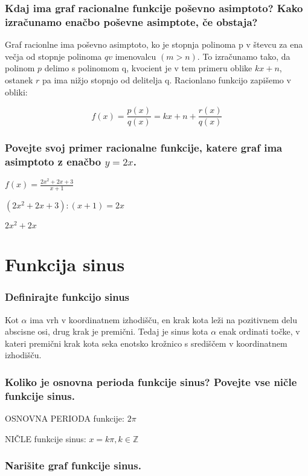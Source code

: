 \documentclass{article}
\begin{document}
\subsubsection*{Kdaj ima graf racionalne funkcije poševno asimptoto? Kako izračunamo enačbo poševne asimptote, če obstaja?}

Graf racionlne ima poševno asimptoto, ko je stopnja polinoma p v števcu za ena večja od stopnje polinoma $q v$ imenovalcu $(m>n)$. To izračunamo tako, da polinom $p$ delimo s polinomom q, kvocient je v tem primeru oblike $k x+n$, ostanek $r$ pa ima nižjo stopnjo od delitelja q. Racionlano funkcijo zapišemo v obliki:

$$
f(x)=\frac{p(x)}{q(x)}=k x+n+\frac{r(x)}{q(x)}
$$

\subsubsection*{Povejte svoj primer racionalne funkcije, katere graf ima asimptoto z enačbo $y=2 x$.}

$f(x)=\frac{2 x^{2}+2 x+3}{x+1}$

$\left(2 x^{2}+2 x+3\right):(x+1)=2 x$

$2 x^{2}+2 x$

\section{Funkcija sinus}
\subsubsection*{Definirajte funkcijo sinus}

Kot $\alpha$ ima vrh v koordinatnem izhodišču, en krak kota leži na pozitivnem delu abscisne osi, drug krak je premični. Tedaj je sinus kota $\alpha$ enak ordinati točke, v kateri premični krak kota seka enotsko krožnico s središčem v koordinatnem izhodišču.

\subsubsection*{Koliko je osnovna perioda funkcije sinus? Povejte vse ničle funkcije sinus.}

OSNOVNA PERIODA funkcije: $2 \pi$

NIČLE funkcije sinus: $x=k \pi, k \in \mathbb{Z}$

\subsubsection*{Narišite graf funkcije sinus.}
\begin{center}
\end{center}
\end{document}
